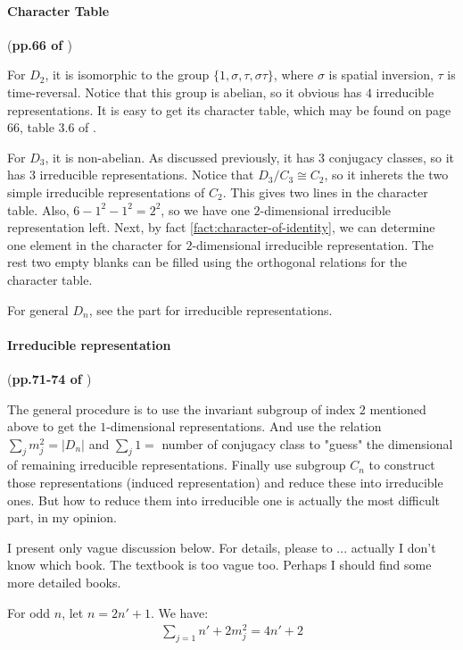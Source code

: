\paragraph{Character Table} (\textbf{pp.66 of \cite{book}})

For $D_2$, it is isomorphic to the group
$\{1,\sigma,\tau,\sigma\tau\}$, where $\sigma$ is spatial inversion,
$\tau$ is time-reversal. Notice that this group is abelian, so it
obvious has $4$ irreducible representations. It is easy to get its
character table, which may be found on page 66, table 3.6 of
\cite{book}.

For $D_3$, it is non-abelian. As discussed previously, it has $3$
conjugacy classes, so it has 3 irreducible representations. Notice
that $D_3/C_3 \cong C_2$, so it inherets the two simple irreducible
representations of $C_2$. This gives two lines in the character
table. Also, $6-1^2-1^2=2^2$, so we have one $2$-dimensional
irreducible representation left.  Next, by fact
\ref{fact:character-of-identity}, we can determine one element in the
character for $2$-dimensional irreducible representation. The rest two
empty blanks can be filled using the orthogonal relations for the
character table.

For general $D_n$, see the part for irreducible representations.

\paragraph{Irreducible representation} (\textbf{pp.71-74 of \cite{book}}) 

The general procedure is to use the invariant subgroup of index $2$
mentioned above to get the $1$-dimensional representations. And use
the relation $\sum_j m_j^2 = |D_n|$ and $\sum_j 1 = $ number of
conjugacy class to "guess" the dimensional of remaining irreducible
representations. Finally use subgroup $C_n$ to construct those
representations (induced representation) and reduce these into
irreducible ones. But how to reduce them into irreducible one is
actually the most difficult part, in my opinion.

I present only vague discussion below. For details, please to ...
actually I don't know which book. The textbook \cite{book} is too
vague too. Perhaps I should find some more detailed books.

For odd $n$, let $n=2n'+1$. We have:
\begin{align}
    \sum_{j=1}{n'+2} m_j^2 = 4n'+2
\end{align}

